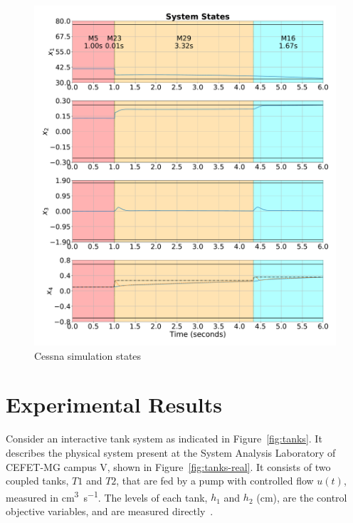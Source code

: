 \begin{figure}[ht!]
  \centering \captionsetup{justification=centering}
  \includegraphics[height=0.6\textheight]{imgs/cessna-x}
  \caption{Cessna simulation states}%
  \label{fig:cessna-x}
\end{figure}

\section{Experimental Results}%
\label{sec:experimental-results}

Consider an interactive tank system as indicated in Figure~\ref{fig:tanks}. It
describes the physical system present at the System Analysis Laboratory of
CEFET-MG campus V, shown in Figure~\ref{fig:tanks-real}. It consists of two
coupled tanks, \(T1\) and \(T2\), that are fed by a pump with controlled flow
\(u(t)\), measured in \si{\cubic\centi\metre\per\second}. The levels of each
tank, \(h_1\) and \(h_2\) (\si{\centi\metre}), are the control objective
variables, and are measured
directly~\parencite{franco.oliveira.ea:síntese,sousa.leite.ea:affordable,lopes.leite.ea:anti-windup}.

